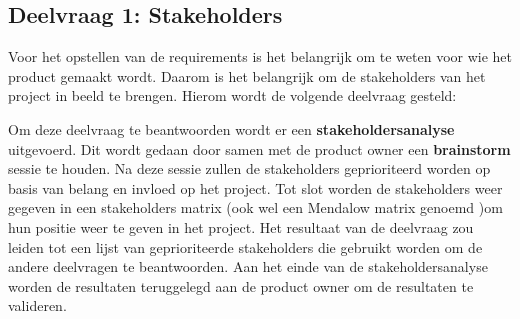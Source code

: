 \subsection{Deelvraag 1: Stakeholders}
Voor het opstellen van de requirements is het belangrijk om te weten voor wie het product gemaakt wordt.
Daarom is het belangrijk om de stakeholders van het project in beeld te brengen.
Hierom wordt de volgende deelvraag gesteld:

\begin{center}
	\textit{\SubquestionOne}
\end{center}

\whitespace[0.2]
Om deze deelvraag te beantwoorden wordt er een \textbf{stakeholdersanalyse} uitgevoerd.
Dit wordt gedaan door samen met de product owner een \textbf{brainstorm} sessie te houden.
Na deze sessie zullen de stakeholders geprioriteerd worden op basis van belang en invloed op het project.
Tot slot worden de stakeholders weer gegeven in een stakeholders matrix (ook wel een Mendalow matrix genoemd \Parencite{MandelowMatrix} )om hun positie weer te geven in het project.
Het resultaat van de deelvraag zou leiden tot een lijst van geprioriteerde stakeholders die gebruikt worden om de andere deelvragen te beantwoorden.
Aan het einde van de stakeholdersanalyse worden de resultaten teruggelegd aan de product owner om de resultaten te valideren.

